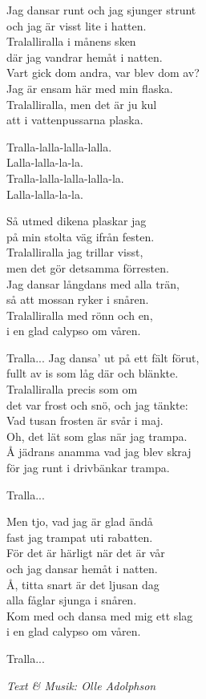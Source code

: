 \vspace{10pt}
Jag dansar runt och jag sjunger strunt\\
och jag är visst lite i hatten.\\
Tralalliralla i månens sken\\
där jag vandrar hemåt i natten.\\
Vart gick dom andra, var blev dom av?\\
Jag är ensam här med min flaska.\\
Tralalliralla, men det är ju kul\\
att i vattenpussarna plaska.\par
\vspace{10pt}
Tralla-lalla-lalla-lalla.\\
Lalla-lalla-la-la.\\
Tralla-lalla-lalla-lalla-la.\\
Lalla-lalla-la-la.\par
\vspace{10pt}
Så utmed dikena plaskar jag\\
på min stolta väg ifrån festen.\\
Tralalliralla jag trillar visst,\\
men det gör detsamma förresten.\\
Jag dansar långdans med alla trän,\\
så att mossan ryker i snåren.\\
Tralalliralla med rönn och en,\\
i en glad calypso om våren.\par
\vspace{10pt}
Tralla...
\newpage
Jag dansa' ut på ett fält förut,\\
fullt av is som låg där och blänkte.\\
Tralalliralla precis som om\\
det var frost och snö, och jag tänkte:\\
Vad tusan frosten är svår i maj.\\
Oh, det lät som glas när jag trampa.\\
Å jädrans anamma vad jag blev skraj\\
för jag runt i drivbänkar trampa.\par
\vspace{10pt}
Tralla...\par
\vspace{10pt}
Men tjo, vad jag är glad ändå\\
fast jag trampat uti rabatten.\\
För det är härligt när det är vår\\
och jag dansar hemåt i natten.\\
Å, titta snart är det ljusan dag\\
alla fåglar sjunga i snåren.\\
Kom med och dansa med mig ett slag\\
i en glad calypso om våren.\par
\vspace{10pt}
Tralla...\par
\vspace{10pt}
{\footnotesize\textit{Text \& Musik: Olle Adolphson}}
